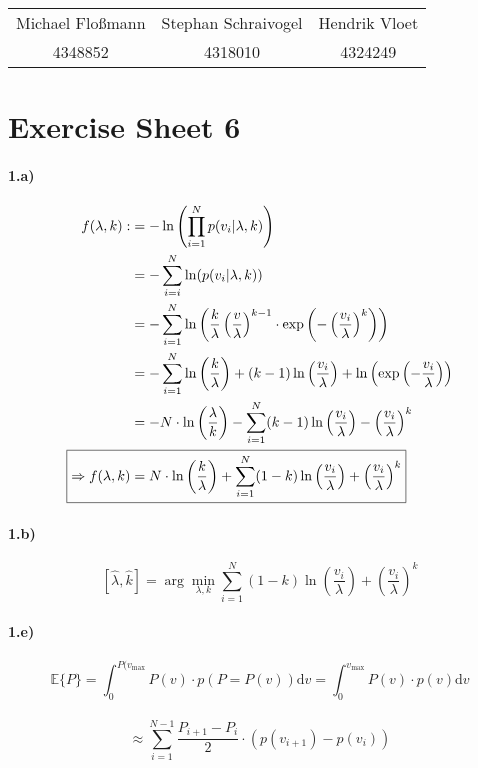 \documentclass[12pt, a4paper]{scrartcl}
\newcommand{\argmin}{\arg\!\min}
\begin{document}
\begin{table}[!h]
  \centering
  \begin{tabular}{c|c|c}
    Michael Floßmann & Stephan Schraivogel & Hendrik Vloet \\ %
    4348852 & 4318010 & 4324249
  \end{tabular}
\end{table}
\section*{Exercise Sheet 6}
\paragraph{1.a)}
\begin{align*}
  f(\lambda,k):&= -\ln
  \left(
    \prod^N_{i=1}p(v_i|\lambda,k)
  \right) \\
  &= -\sum^N_{i=i}\ln(p(v_i|\lambda,k)) \\
  &= -\sum^N_{i=1}\ln
  \left(
    \frac{k}{\lambda}
    \left(
      \frac{v}{\lambda}
    \right)^{k-1} \cdot 
    \exp
    \left(-
      \left(
        \frac{v_i}{\lambda}
      \right)^k
      \right)
  \right) \\
  &= -\sum^N_{i=1}\ln
  \left(
    \frac{k}{\lambda}
  \right)
  + (k-1)\ln
  \left(
\frac{v_i}{\lambda}
  \right) + \ln
  \left(
    \exp
    \left(
      -\frac{v_i}{\lambda}
    \right)
  \right) \\
  &=-N\cdot\ln
  \left(
    \frac{\lambda}{k}
  \right)-\sum^N_{i=1}(k-1)\ln
  \left(
    \frac{v_i}{\lambda}
  \right) -
  \left(
    \frac{v_i}{\lambda}
  \right)^k \\
\Aboxed{\Rightarrow f(\lambda,k) &= N\cdot\ln
  \left(
    \frac{k}{\lambda}
  \right)+\sum^N_{i=1}(1-k)\ln
  \left(
    \frac{v_i}{\lambda}
  \right) +
  \left(
    \frac{v_i}{\lambda}
  \right)^k}
\end{align*}

\paragraph{1.b)}
\[\boxed{
[\hat{\lambda},\hat{k}]=\argmin_{\lambda,k}\sum^N_{i=1}(1-k)\ln
\left(
  \frac{v_i}{\lambda}
\right)+
\left(
  \frac{v_i}{\lambda}
\right)^k
}\]

\paragraph{1.e)}
\[\mathbb{E}\{P\}=\int_0^{P(v_\mathrm{max}} P(v)\cdot p(P=P(v))\mathrm{d}v = \int_0^{v_\mathrm{max}} P(v)\cdot p(v)\mathrm{d}v\] \\
\[\approx \sum_{i=1}^{N-1}\frac{P_{i+1}-P_i}{2}\cdot (p(v_{i+1}) - p(v_i))
 \]
\end{document}
